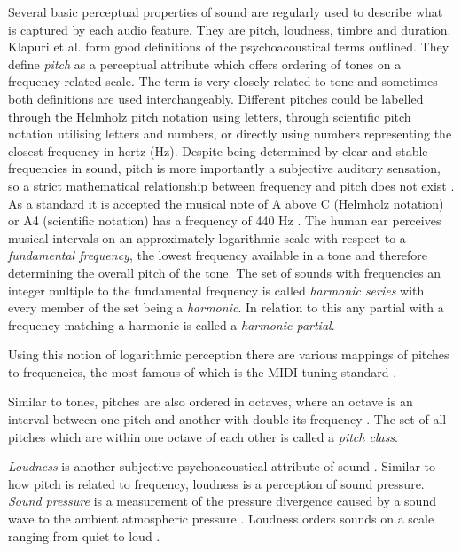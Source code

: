 Several basic perceptual properties of sound are regularly used to describe what
is captured by each audio feature. They are pitch, loudness, timbre and
duration. Klapuri et al. \cite{klapuri2007signal} form good definitions of the
psychoacoustical terms outlined. They define \textit{pitch} as a perceptual
attribute which offers ordering of tones on a frequency-related scale. The term
is very closely related to tone and sometimes both definitions are used
interchangeably. Different pitches could be labelled through the Helmholz pitch
notation \cite{helmholtz2013sensations} using letters, through scientific pitch
notation \cite{fletcher1934loudness} utilising letters and numbers, or directly
using numbers representing the closest frequency in hertz (Hz). Despite being
determined by clear and stable frequencies in sound, pitch is more importantly a
subjective auditory sensation, so a strict mathematical relationship between
frequency and pitch does not exist \cite{acoustical1986american}. As a standard
it is accepted the musical note of A above C (Helmholz notation) or A4
(scientific notation) has a frequency of 440 Hz \cite{young1939terminology}. The
human ear perceives musical intervals on an approximately logarithmic scale with
respect to a \textit{fundamental frequency}, the lowest frequency available in a
tone and therefore determining the overall pitch of the tone. The set of sounds
with frequencies an integer multiple to the fundamental frequency is called
\textit{harmonic series} with every member of the set being a \textit{harmonic}.
In relation to this any partial with a frequency matching a harmonic is called a
\textit{harmonic partial}.

Using this notion of logarithmic perception there are various mappings of
pitches to frequencies, the most famous of which is the MIDI tuning standard
\cite{mts}.

Similar to tones, pitches are also ordered in octaves, where an octave is an
interval between one pitch and another with double its frequency
\cite{wiki:octave}. The set of all pitches which are within one octave of each
other is called a \textit{pitch class}.

\textit{Loudness} is another subjective psychoacoustical attribute of sound
\cite{klapuri2007signal}. Similar to how pitch is related to frequency, loudness
is a perception of sound pressure. \textit{Sound pressure} is a measurement of
the pressure divergence caused by a sound wave to the ambient atmospheric
pressure \cite{sound-pressure}. Loudness orders sounds on a scale ranging from
quiet to loud \cite{acoustical1986american}.

